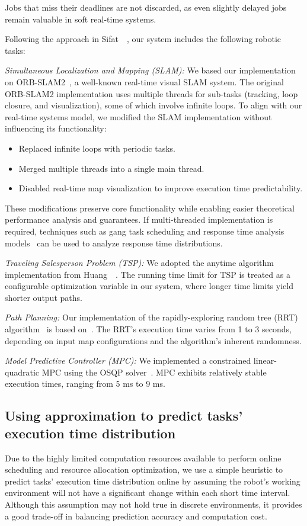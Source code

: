 Jobs that miss their deadlines are not discarded, as even slightly delayed jobs remain valuable in soft real-time systems.

Following the approach in Sifat~\etal~\cite{Ash23RAL}, our system includes the following robotic tasks:

\textit{Simultaneous Localization and Mapping (SLAM):}
We based our implementation on ORB-SLAM2~\cite{murORB2}, a well-known real-time visual SLAM system.
The original ORB-SLAM2 implementation uses multiple threads for sub-tasks (\eg tracking, loop closure, and visualization), some of which involve infinite loops.
To align with our real-time systems model, we modified the SLAM implementation without influencing its functionality:
\begin{itemize}
    \item Replaced infinite loops with periodic tasks.
    \item Merged multiple threads into a single main thread.
    \item Disabled real-time map visualization to improve execution time predictability.
\end{itemize}
These modifications preserve core functionality while enabling easier theoretical performance analysis and guarantees.
If multi-threaded implementation is required, techniques such as gang task scheduling and response time analysis models~\cite{Sun2024StrictPF} can be used to analyze response time distributions.

\textit{Traveling Salesperson Problem (TSP):}
We adopted the anytime algorithm implementation from Huang~\etal~\cite{Huang23ICRA_TSP}.
The running time limit for TSP is treated as a configurable optimization variable in our system, where longer time limits yield shorter output paths.

\textit{Path Planning:}
Our implementation of the rapidly-exploring random tree (RRT) algorithm~\cite{LaValle1998RapidlyexploringRT} is based on~\cite{rrt_github}.
The RRT's execution time varies from 1 to 3 seconds, depending on input map configurations and the algorithm's inherent randomness.

\textit{Model Predictive Controller (MPC):}
We implemented a constrained linear-quadratic MPC using the OSQP solver~\cite{stellato18OSQP}.
MPC exhibits relatively stable execution times, ranging from 5 ms to 9 ms.

\subsection{Using approximation to predict tasks' execution time distribution}
\label{section: predict_ET_exp}
Due to the highly limited computation resources available to perform online scheduling and resource allocation optimization, we use a simple heuristic to predict tasks' execution time distribution online by assuming the robot's working environment will not have a significant change within each short time interval.
Although this assumption may not hold true in discrete environments, it provides a good trade-off in balancing prediction accuracy and computation cost.


